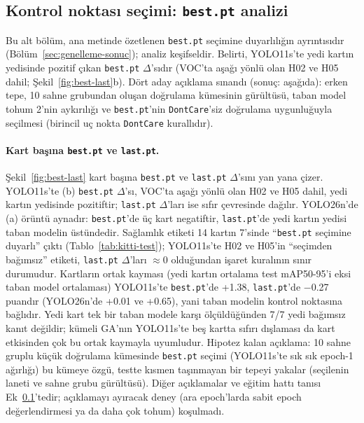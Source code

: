 \subsection{Kontrol noktası seçimi: \texttt{best.pt} analizi}\label{sec:ek-kontrol-noktasi}
Bu alt bölüm, ana metinde özetlenen \texttt{best.pt} seçimine duyarlılığın ayrıntısıdır (Bölüm~\ref{sec:genelleme-sonuc}); analiz keşifseldir. Belirti, YOLO11s'te yedi kartın yedisinde pozitif çıkan \texttt{best.pt} $\Delta$'sıdır (VOC'ta aşağı yönlü olan H02 ve H05 dahil; Şekil~\ref{fig:best-last}b). Dört aday açıklama sınandı (sonuç: aşağıda): erken tepe, 10 sahne grubundan oluşan doğrulama kümesinin gürültüsü, taban model tohum 2'nin aykırılığı ve \texttt{best.pt}'nin \texttt{DontCare}'siz doğrulama uygunluğuyla seçilmesi (birincil uç nokta \texttt{DontCare} kurallıdır).

{%
}

\paragraph{Kart başına \texttt{best.pt} ve \texttt{last.pt}.}
Şekil~\ref{fig:best-last} kart başına \texttt{best.pt} ve \texttt{last.pt} $\Delta$'sını yan yana çizer. YOLO11s'te (b) \texttt{best.pt} $\Delta$'sı, VOC'ta aşağı yönlü olan H02 ve H05 dahil, yedi kartın yedisinde pozitiftir; \texttt{last.pt} $\Delta$'ları ise sıfır çevresinde dağılır. YOLO26n'de (a) örüntü aynadır: \texttt{best.pt}'de üç kart negatiftir, \texttt{last.pt}'de yedi kartın yedisi taban modelin üstündedir. Sağlamlık etiketi 14 kartın 7'sinde ``\texttt{best.pt} seçimine duyarlı'' çıktı (Tablo~\ref{tab:kitti-test}); YOLO11s'te H02 ve H05'in ``seçimden bağımsız'' etiketi, \texttt{last.pt} $\Delta$'ları $\approx$0 olduğundan işaret kuralının sınır durumudur. Kartların ortak kayması (yedi kartın ortalama test mAP50-95'i eksi taban model ortalaması) YOLO11s'te \texttt{best.pt}'de +1.38, \texttt{last.pt}'de $-$0.27 puandır (YOLO26n'de +0.01 ve +0.65), yani taban modelin kontrol noktasına bağlıdır. Yedi kart tek bir taban modele karşı ölçüldüğünden 7/7 yedi bağımsız kanıt değildir; kümeli GA'nın YOLO11s'te beş kartta sıfırı dışlaması da kart etkisinden çok bu ortak kaymayla uyumludur. Hipotez kalan açıklama: 10 sahne gruplu küçük doğrulama kümesinde \texttt{best.pt} seçimi (YOLO11s'te sık sık epoch-1 ağırlığı) bu kümeye özgü, testte kısmen taşınmayan bir tepeyi yakalar (seçilenin laneti ve sahne grubu gürültüsü). Diğer açıklamalar ve eğitim hattı tanısı Ek~\ref{sec:ek-kontrol-noktasi}'tedir; açıklamayı ayıracak deney (ara epoch'larda sabit epoch değerlendirmesi ya da daha çok tohum) koşulmadı.

